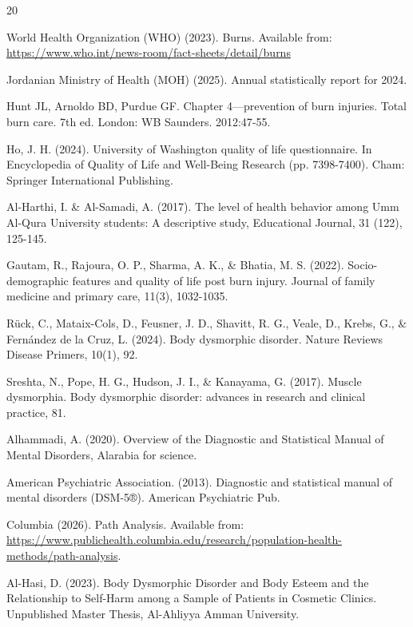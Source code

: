 \documentclass[10pt]{NSP1}
\begin{document}
	\begin{thebibliography}{20}
		
		 World Health Organization (WHO) (2023). Burns. Available from: \url{https://www.who.int/news-room/fact-sheets/detail/burns}
		
		 Jordanian Ministry of Health (MOH) (2025). Annual statistically report for 2024.
		
		 Hunt JL, Arnoldo BD, Purdue GF. Chapter 4—prevention of burn injuries. Total burn care. 7th ed. London: WB Saunders. 2012:47‑55.
		
		 Ho, J. H. (2024). University of Washington quality of life questionnaire. In Encyclopedia of Quality of Life and Well-Being Research (pp. 7398-7400). Cham: Springer International Publishing.
		
		 Al-Harthi, I. \& Al-Samadi, A. (2017). The level of health behavior among Umm Al-Qura University students: A descriptive study, Educational Journal, 31 (122), 125-145.
		
		 Gautam, R., Rajoura, O. P., Sharma, A. K., \& Bhatia, M. S. (2022). Socio-demographic features and quality of life post burn injury. Journal of family medicine and primary care, 11(3), 1032-1035.
		
		 Rück, C., Mataix-Cols, D., Feusner, J. D., Shavitt, R. G., Veale, D., Krebs, G., \& Fernández de la Cruz, L. (2024). Body dysmorphic disorder. Nature Reviews Disease Primers, 10(1), 92.
		
		 Sreshta, N., Pope, H. G., Hudson, J. I., \& Kanayama, G. (2017). Muscle dysmorphia. Body dysmorphic disorder: advances in research and clinical practice, 81.
		
		 Alhammadi, A. (2020). Overview of the Diagnostic and Statistical Manual of Mental Disorders, Alarabia for science.
		
		 American Psychiatric Association. (2013). Diagnostic and statistical manual of mental disorders (DSM-5®). American Psychiatric Pub.
		
		 Columbia (2026). Path Analysis. Available from: \url{https://www.publichealth.columbia.edu/research/population-health-methods/path-analysis}.
		
		 Al-Hasi, D. (2023). Body Dysmorphic Disorder and Body Esteem and the Relationship to Self-Harm among a Sample of Patients in Cosmetic Clinics. Unpublished Master Thesis, Al-Ahliyya Amman University.
		

\end{thebibliography}
\end{document}
